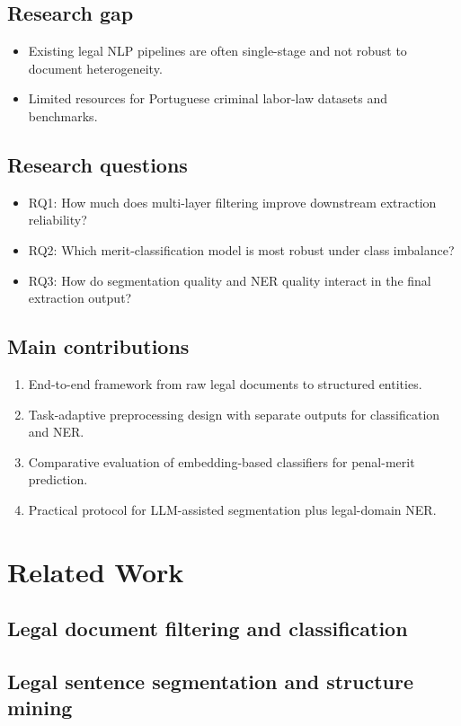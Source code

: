 \documentclass[a4paper,fleqn]{cas-sc}
\begin{document}
\subsection{Research gap}
\begin{itemize}
    \item Existing legal NLP pipelines are often single-stage and not robust to document heterogeneity.
    \item Limited resources for Portuguese criminal labor-law datasets and benchmarks.
\end{itemize}
\subsection{Research questions}
\begin{itemize}
    \item RQ1: How much does multi-layer filtering improve downstream extraction reliability?
    \item RQ2: Which merit-classification model is most robust under class imbalance?
    \item RQ3: How do segmentation quality and NER quality interact in the final extraction output?
\end{itemize}
\subsection{Main contributions}
\begin{enumerate}
    \item End-to-end framework from raw legal documents to structured entities.
    \item Task-adaptive preprocessing design with separate outputs for classification and NER.
    \item Comparative evaluation of embedding-based classifiers for penal-merit prediction.
    \item Practical protocol for LLM-assisted segmentation plus legal-domain NER.
\end{enumerate}

\section{Related Work}
\label{sec:related}
\subsection{Legal document filtering and classification}
\subsection{Legal sentence segmentation and structure mining}
\end{document}
